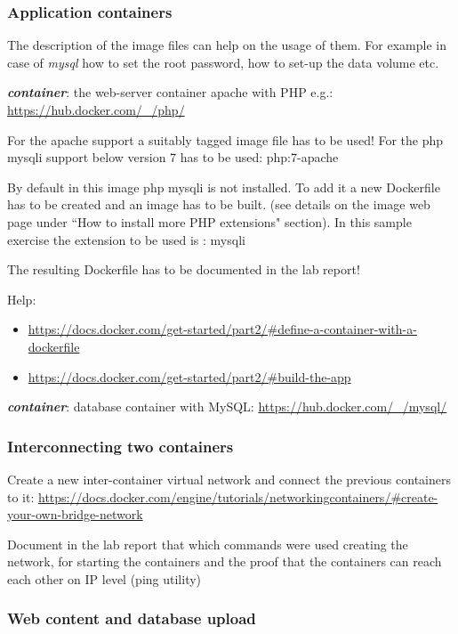 \documentclass[a4paper]{article}
\begin{document}
\subsubsection{Application containers}
The description of the image files can help on the usage of them. For example in case of \emph{mysql} how to set the root password, how to set-up the data volume etc.

\textbf{\emph{ container}}: the web-server container apache with PHP e.g.: \url{https://hub.docker.com/_/php/}

For the apache support a suitably tagged image file has to be used! For the php mysqli support below version 7 has to be used: php:7-apache

By default in this image php mysqli is not installed. To add it a new Dockerfile has to be created and an image has to be built. (see details on the image web page under ``How to install more PHP extensions" section). In this sample exercise the extension to be used is : mysqli

The resulting Dockerfile has to be documented in the lab report!

Help:
\begin{itemize}
\item \url{https://docs.docker.com/get-started/part2/#define-a-container-with-a-dockerfile}
\item \url{https://docs.docker.com/get-started/part2/#build-the-app}
\end{itemize}

\textbf{\emph{ container}}: database container with MySQL: \url{https://hub.docker.com/_/mysql/}

\subsubsection{Interconnecting two containers}
Create a new inter-container virtual network and connect the previous containers to it: \url{https://docs.docker.com/engine/tutorials/networkingcontainers/#create-your-own-bridge-network}

Document in the lab report that which commands were used creating the network, for starting the containers and the proof that the containers can reach each other on IP level (ping utility) 

\subsubsection{Web content and database upload}
\end{document}
